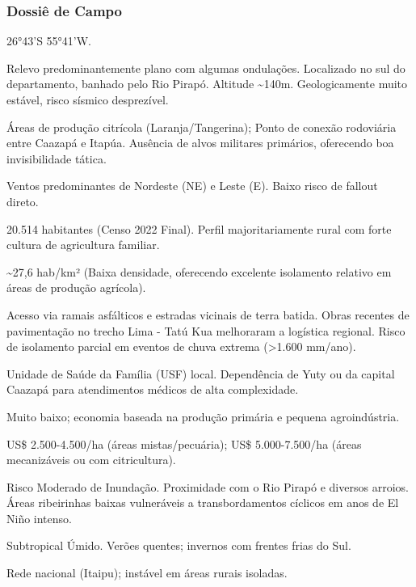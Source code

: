 \subsubsection{Dossiê de Campo}
\begin{description}[style=nextline,leftmargin=0.5cm,font=\bfseries]
\item[Coordenadas]  26°43'S 55°41'W.
\item[Topografia]  Relevo predominantemente plano com algumas ondulações. Localizado no sul do departamento, banhado pelo Rio Pirapó. Altitude \textasciitilde 140m. Geologicamente muito estável, risco sísmico desprezível.
\item[Alvos Estratégicos]  Áreas de produção citrícola (Laranja/\allowbreak Tangerina); Ponto de conexão rodoviária entre Caazapá e Itapúa. Ausência de alvos militares primários, oferecendo boa invisibilidade tática.
\item[Fallout]  Ventos predominantes de Nordeste (NE) e Leste (E). Baixo risco de fallout direto.
\item[População]  20.514 habitantes (Censo 2022 Final). Perfil majoritariamente rural com forte cultura de agricultura familiar.
\item[Densidade]  \textasciitilde 27,6 hab/\allowbreak km² (Baixa densidade, oferecendo excelente isolamento relativo em áreas de produção agrícola).
\item[Vias de Acesso]  Acesso via ramais asfálticos e estradas vicinais de terra batida. Obras recentes de pavimentação no trecho Lima - Tatú Kua melhoraram a logística regional. Risco de isolamento parcial em eventos de chuva extrema (>1.600 mm/\allowbreak ano).
\item[Serviços]  Unidade de Saúde da Família (USF) local. Dependência de Yuty ou da capital Caazapá para atendimentos médicos de alta complexidade.
\item[Custo de Vida]  Muito baixo; economia baseada na produção primária e pequena agroindústria.
\item[Preço da Terra]  US\$ 2.500-4.500/\allowbreak ha (áreas mistas/\allowbreak pecuária); US\$ 5.000-7.500/\allowbreak ha (áreas mecanizáveis ou com citricultura).
\item[Hidrologia]  Risco Moderado de Inundação. Proximidade com o Rio Pirapó e diversos arroios. Áreas ribeirinhas baixas vulneráveis a transbordamentos cíclicos em anos de El Niño intenso.
\item[Clima]  Subtropical Úmido. Verões quentes; invernos com frentes frias do Sul.
\item[Energia]  Rede nacional (Itaipu); instável em áreas rurais isoladas.

\end{description}
